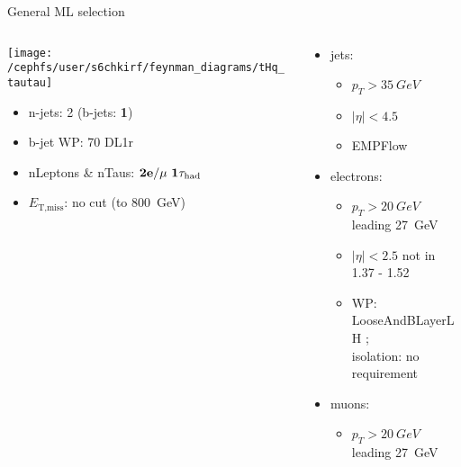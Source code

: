 \begin{frame}{General ML selection}
    \begin{columns}
      \begin{column}{0.5\textwidth}
        \centering \texttt{[image: /cephfs/user/s6chkirf/feynman\_diagrams/tHq\_tautau]}\\
                \begin{itemize}
          \item n-jets: 2 (b-jets: \textbf{1})
          \item b-jet WP: 70 DL1r
          \item nLeptons \& nTaus: $\bf{2e / \mu~1\tau_{\text{had}}} $
          \item $E_{\text{T,miss}}$: no cut (to \SI{800}{GeV})
        \end{itemize}
      \end{column}
      \begin{column}{0.7\textwidth}
        \vspace*{-0.05\textwidth}
        \begin{itemize}
          \footnotesize
          \item jets:
          \vspace*{-0.02\textwidth}
          \begin{itemize}
            \footnotesize
            \item $p_T>\SI{35}{GeV}$
            \item $|\eta|<4.5$
            \item EMPFlow
          \end{itemize}
          \item electrons:
          \vspace*{-0.02\textwidth}
          \begin{itemize}
            \footnotesize
            \item $p_T>\SI{20}{GeV}$ leading \SI{27}{GeV}
            \item $|\eta|<2.5$ not in 1.37 - 1.52
            \item WP: LooseAndBLayerLH ; \\isolation: no requirement
          \end{itemize}
          \item muons:
          \vspace*{-0.02\textwidth}
          \begin{itemize}
            \footnotesize
            \item $p_T>\SI{20}{GeV}$ leading \SI{27}{GeV}

\end{itemize}
\end{itemize}
\end{column}
\end{columns}
\end{frame}
